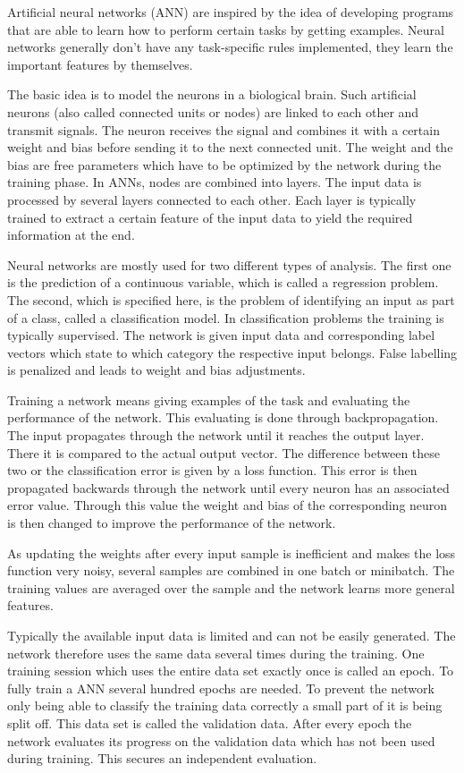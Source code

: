 Artificial neural networks (ANN) are inspired by the idea of developing programs that are able to learn how to perform certain tasks by getting examples. Neural networks generally don't have any task-specific rules implemented, they learn the important features by themselves. 

The basic idea is to model the neurons in a biological brain. Such artificial neurons (also called connected units or nodes) are linked to each other and transmit signals. The neuron receives the signal and combines it with a certain weight and bias before sending it to the next connected unit. The weight and the bias are free parameters which have to be optimized by the network during the training phase. 
In ANNs, nodes are combined into layers. The input data is processed by several layers connected to each other. Each layer is typically trained to extract a certain feature of the input data to yield the required information at the end. 

Neural networks are mostly used for two different types of analysis. The first one is the prediction of a continuous variable, which is called a regression problem. The second, which is specified here, is the problem of identifying an input as part of a class, called a classification model.
In classification problems the training is typically supervised. The network is given input data and corresponding label vectors which state to which category the respective input belongs. False labelling is penalized and leads to weight and bias adjustments.

Training a network means giving examples of the task and evaluating the performance of the network. This evaluating is done through backpropagation. The input propagates through the network until it reaches the output layer. There it is compared to the actual output vector. The difference between these two or the classification error is given by a loss function. This error is then propagated backwards through the network until every neuron has an associated error value. Through this value the weight and bias of the corresponding neuron is then changed to improve the performance of the network. 

As updating the weights after every input sample is inefficient and makes the loss function very noisy, several samples are combined in one batch or minibatch. The training values are averaged over the sample and the network learns more general features. 

Typically the available input data is limited and can not be easily generated. The network therefore uses the same data several times during the training. One training session which uses the entire data set exactly once is called an epoch. To fully train a ANN several hundred epochs are needed. To prevent the network only being able to classify the training data correctly a small part of it is being split off. This data set is called the validation data. After every epoch the network evaluates its progress on the validation data which has not been used during training. This secures an independent evaluation.  

